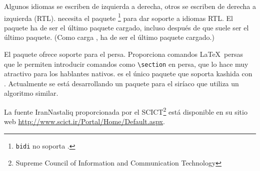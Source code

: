 Algunos idiomas se escriben de izquierda a derecha, otros se escriben de 
derecha a izquierda (RTL).  necesita el paquete 
\cite{bidi}\footnote{\texttt{bidi} no soporta .} para
dar soporte a idiomas RTL. El paquete  ha de ser el último paquete 
cargado, incluso después de  que suele ser el último paquete.
(Como  carga ,  ha de ser el último 
paquete cargado.)

El paquete \cite{xepersian} ofrece soporte para
el persa. Proporciona comandos \LaTeX\ persas que le permiten introducir 
comandos como \verb|\section| en persa, que lo hace muy atractivo para los 
hablantes nativos.  es el único paquete que soporta 
kashida con . Actualmente se está desarrollando 
un paquete para el siríaco que utiliza un algoritmo similar.

La fuente IranNastaliq proporcionada por el SCICT\footnote{Supreme Council of
Information and Communication Technology} está disponible en su sitio web 
\url{http://www.scict.ir/Portal/Home/Default.aspx}. 

